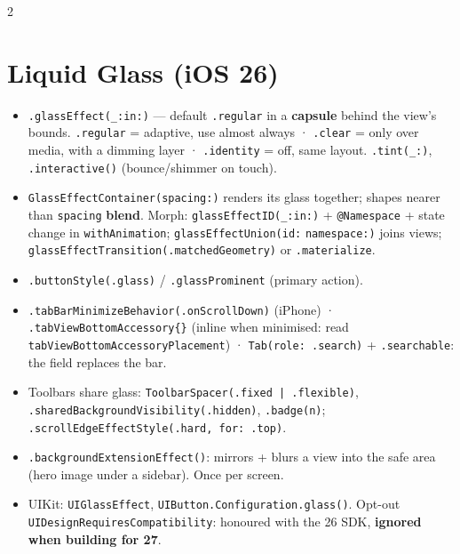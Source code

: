 \documentclass[8pt]{extarticle}
\begin{document}

\begin{multicols}{2}
\raggedright

\section{Liquid Glass (iOS 26)}
\begin{itemize}
  \item \texttt{.glassEffect(\_:in:)} — default \texttt{.regular} in a \textbf{capsule} behind
        the view's bounds. \texttt{.regular} = adaptive, use almost always · \texttt{.clear} =
        only over media, with a dimming layer · \texttt{.identity} = off, same layout.
        \texttt{.tint(\_:)}, \texttt{.interactive()} (bounce/shimmer on touch).
  \item \texttt{GlassEffectContainer(spacing:)} renders its glass together; shapes nearer than
        \texttt{spacing} \textbf{blend}. Morph: \texttt{glassEffectID(\_:in:)} + \texttt{@Namespace}
        + state change in \texttt{withAnimation}; \texttt{glassEffectUnion(id:}\allowbreak
        \texttt{namespace:)} joins views; \texttt{glassEffectTransition(.matchedGeometry)}
        or \texttt{.materialize}.
  \item \texttt{.buttonStyle(.glass)} / \texttt{.glassProminent} (primary action).
  \item \texttt{.tabBarMinimizeBehavior(.onScrollDown)} (iPhone) ·
        \texttt{.tabViewBottomAccessory\{\}} (inline when minimised: read
        \texttt{tabViewBottomAccessoryPlacement}) · \texttt{Tab(role: .search)} +
        \texttt{.searchable}: the field replaces the bar.
  \item Toolbars share glass: \texttt{ToolbarSpacer(.fixed | .flexible)},
        \texttt{.sharedBackground}\allowbreak\texttt{Visibility(.hidden)}, \texttt{.badge(n)};
        \texttt{.scrollEdgeEffectStyle(.hard, for: .top)}.
  \item \texttt{.backgroundExtensionEffect()}: mirrors + blurs a view into the safe area
        (hero image under a sidebar). Once per screen.
  \item UIKit: \texttt{UIGlassEffect}, \texttt{UIButton.Configuration.glass()}. Opt-out
        \texttt{UIDesign}\allowbreak\texttt{RequiresCompatibility}: honoured with the 26 SDK,
        \textbf{ignored when building for 27}.
\end{itemize}


\end{multicols}
\end{document}
